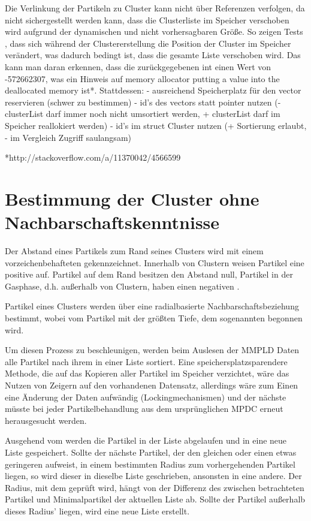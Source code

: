 Die Verlinkung der Partikeln zu Cluster kann nicht über Referenzen verfolgen, da nicht sichergestellt werden kann, dass die Clusterliste im Speicher verschoben wird aufgrund der dynamischen und nicht vorhersagbaren Größe. So zeigen Tests %
, dass sich während der Clustererstellung die Position der Cluster im Speicher verändert, was dadurch bedingt ist, dass die gesamte Liste verschoben wird. Das kann man daran erkennen, dass die zurückgegebenen int einen Wert von -572662307, was ein Hinweis auf memory allocator putting a value into the deallocated memory ist*. Stattdessen:
- ausreichend Speicherplatz für den vector reservieren (schwer zu bestimmen)
- id's des vectors statt pointer nutzen (- clusterList darf immer noch nicht umsortiert werden, + clusterList darf im Speicher reallokiert werden)
- id's im struct Cluster nutzen (+ Sortierung erlaubt, - im Vergleich Zugriff saulangsam)

*http://stackoverflow.com/a/11370042/4566599


\section{Bestimmung der Cluster ohne Nachbarschaftskenntnisse}
Der Abstand eines Partikels zum Rand seines Clusters wird mit einem vorzeichenbehafteten  gekennzeichnet. Innerhalb von Clustern weisen Partikel eine positive  auf. Partikel auf dem Rand besitzen den Abstand null, Partikel in der Gasphase, d.h. außerhalb von Clustern, haben einen negativen .

Partikel eines Clusters werden über eine radialbasierte Nachbarschaftsbeziehung bestimmt, wobei vom Partikel mit der größten Tiefe, dem sogenannten  begonnen wird.

Um diesen Prozess zu beschleunigen, werden beim Auslesen der MMPLD Daten alle Partikel nach ihrem  in einer Liste sortiert. Eine speichersplatzsparendere Methode, die auf das Kopieren aller Partikel im Speicher verzichtet, wäre das Nutzen von Zeigern auf den vorhandenen Datensatz, allerdings wäre zum Einen eine Änderung der Daten aufwändig (Lockingmechanismen) und der nächste  müsste bei jeder Partikelbehandlung aus dem ursprünglichen MPDC erneut herausgesucht werden.

Ausgehend vom  werden die Partikel in der Liste abgelaufen und in eine neue Liste gespeichert. Sollte der nächste Partikel, der den gleichen oder einen etwas geringeren  aufweist, in einem bestimmten Radius zum vorhergehenden Partikel liegen, so wird dieser in dieselbe Liste geschrieben, ansonsten in eine andere. Der Radius, mit dem geprüft wird, hängt von der Differenz des  zwischen betrachteten Partikel und Minimalpartikel der aktuellen Liste ab. Sollte der Partikel außerhalb dieses Radius' liegen, wird eine neue Liste erstellt.

